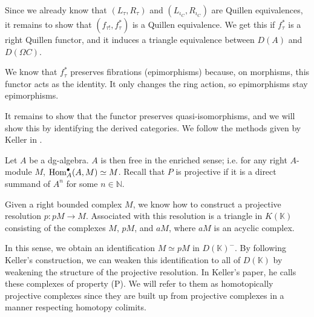 \documentclass[../thesis.tex]{subfiles}
\begin{document}
            Since we already know that $(L_\tau, R_\tau)$ and $(L_{\iota_C}, R_{\iota_C})$ are Quillen equivalences, it remains to show that $(f_{\tau !},f_\tau^*)$ is a Quillen equivalence. We get this if $f_\tau^*$ is a right Quillen functor, and it induces a triangle equivalence between $D(A)$ and $D(\Omega C)$.

            We know that $f_\tau^*$ preserves fibrations (epimorphisms) because, on morphisms, this functor acts as the identity. It only changes the ring action, so epimorphisms stay epimorphisms. 
            
            It remains to show that the functor preserves quasi-isomorphisms, and we will show this by identifying the derived categories. We follow the methods given by Keller in \cite{Keller94}.

            Let $A$ be a dg-algebra. $A$ is then free in the enriched sense; i.e. for any right $A$-module $M$, ${\tt{Hom}}^\bullet_A(A,M) \simeq M$. Recall that $P$ is projective if it is a direct summand of $A^n$ for some $n\in \mathbb{N}$. 
            
            Given a right bounded complex $M$, we know how to construct a projective resolution $p: pM \rightarrow M$. Associated with this resolution is a triangle in $K(\mathbb{K})$ consisting of the complexes $M$, $pM$, and $aM$, where $aM$ is an acyclic complex.

            \begin{center}
            \end{center}

            In this sense, we obtain an identification $M \simeq pM$ in $D(\mathbb{K})^-$. By following Keller's construction, we can weaken this identification to all of $D(\mathbb{K})$ by weakening the structure of the projective resolution. In Keller's paper, he calls these complexes of property (P). We will refer to them as homotopically projective complexes since they are built up from projective complexes in a manner respecting homotopy colimits.
\end{document}
